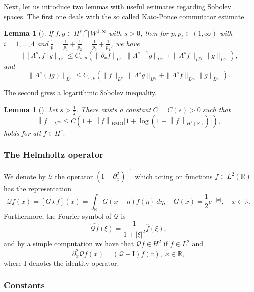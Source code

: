 \documentclass[final,11pt,a4paper,reqno]{amsart}
\newcommand{\norm}[1]{\left\| #1 \right\|}
\newcommand{\RR}{\mathbb R}
\newcommand{\pa}{\partial}
\newtheorem{lem}[satz]{Lemma}
\theoremstyle{definition}
\begin{document}
Next, let us introduce two lemmas with useful estimates regarding Sobolev spaces. The first one deals with the so called Kato-Ponce commutator estimate.
\begin{lem}[\cite{Kato-Ponce-1988-CPAM, Kenig-Ponce-Vega-1991-JAMS}]\label{Kato-Ponce commutator estimate}
		If $f,g\in H^s\bigcap W^{1,\infty}$ with $s>0$, then for $p,p_i\in(1,\infty)$ with $i=1,\ldots,4$ and 
		$\frac{1}{p}=\frac{1}{p_1}+\frac{1}{p_2}=\frac{1}{p_3}+\frac{1}{p_4}$, we have
		$$
		\|\left[\Lambda^s,f\right]g\|_{L^p}\leq C_{s,p}(\|\pa_{x} f\|_{L^{p_1}}\|\Lambda^{s-1}g\|_{L^{p_2}}+\|\Lambda^sf\|_{L^{p_3}}\|g\|_{L^{p_4}}),$$
		and
		$$\|\Lambda^s(fg)\|_{L^p}\leq C_{s,p}(\|f\|_{L^{p_1}}\|\Lambda^s g\|_{L^{p_2}}+\|\Lambda^s f\|_{L^{p_3}}\|g\|_{L^{p_4}}).$$
	\end{lem}
The second gives a logarithmic Sobolev inequality.
\begin{lem}[\cite{Dong-2008-JFA}]\label{Sob:log}
Let $s>\frac{1}{2}$. There exists a constant $C=C(s)>0$ such that
\begin{equation*}
\norm{f}_{L^{\infty}}\leq C\left(1+\norm{f}_{\text{BMO}}\big[1+\displaystyle\log(1+\norm{f}_{H^{s}(\RR)}) \big] \right),
\end{equation*}
holds for all $f\in H^{s}.$
\end{lem}
	
\subsubsection*{\textsf{The Helmholtz operator}}

We denote by $\mathscr{Q}$ the operator $(1-\partial_{x}^{2})^{-1}$ which acting on functions $f\in L^{2}(\RR)$ has the representation 
\begin{equation} \label{repre:Q}
\mathscr{Q}f(x)=[G\star f](x)=\int_{\RR} G(x-\eta) f(\eta) \  d\eta ,  \quad G(x)=\frac{1}{2}e^{-|x|}, \quad x\in\RR.
\end{equation}
Furthermore, the Fourier symbol of $\mathscr{Q}$ is
$$\widehat{\mathscr{Q}f}(\xi)=\frac{1}{1+|\xi|^{2}}\widehat{f}(\xi),$$
and by a simple computation we have that $\mathscr{Q}f\in H^{2}$ if $f\in L^{2}$ and
\begin{equation}\label{comp:helmholtz}
\pa_{x}^{2}\mathscr{Q}f(x)=\left( \mathscr{Q}-\text{I}\right)f(x),\; x\in\mathbb{R},
\end{equation}
where $\text{I}$ denotes the identity operator.


\subsubsection*{\textsf{Constants}}
\end{document}
